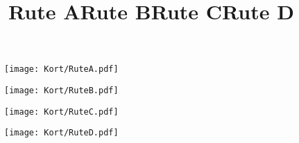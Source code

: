 \documentclass[a4paper,12pt,landscape]{article}
\begin{document}
\title{\textcolor{efterårsrød}{Rute A}}
\vspace{0.8cm}
\begin{figure}[H]
    \centering
    \texttt{[image: Kort/RuteA.pdf]}
\end{figure}

\newpage
\title{\textcolor{søblå}{Rute B}}
\vspace{0.8cm}
\begin{figure}[H]
    \centering
    \texttt{[image: Kort/RuteB.pdf]}
\end{figure}

\newpage
\title{\textcolor{korngul}{Rute C}}
\vspace{0.8cm}
\begin{figure}[H]
    \centering
    \texttt{[image: Kort/RuteC.pdf]}
\end{figure}

\newpage
\title{\textcolor{græsgrøn}{Rute D}}
\vspace{0.8cm}
\begin{figure}[H]
    \centering
    \texttt{[image: Kort/RuteD.pdf]}
\end{figure}
\end{document}
